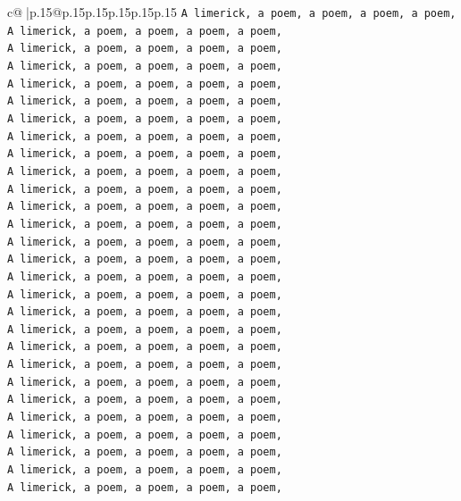 \documentclass{article}
\begin{document}
{\begin{supertabular}{c@{$\;$}|p{.15\linewidth}@{}p{.15\linewidth}p{.15\linewidth}p{.15\linewidth}p{.15\linewidth}p{.15\linewidth}}
{{{\texttt{A limerick, a poem, a poem, a poem, a poem,} \\
\texttt{A limerick, a poem, a poem, a poem, a poem,} \\
\texttt{A limerick, a poem, a poem, a poem, a poem,} \\
\texttt{A limerick, a poem, a poem, a poem, a poem,} \\
\texttt{A limerick, a poem, a poem, a poem, a poem,} \\
\texttt{A limerick, a poem, a poem, a poem, a poem,} \\
\texttt{A limerick, a poem, a poem, a poem, a poem,} \\
\texttt{A limerick, a poem, a poem, a poem, a poem,} \\
\texttt{A limerick, a poem, a poem, a poem, a poem,} \\
\texttt{A limerick, a poem, a poem, a poem, a poem,} \\
\texttt{A limerick, a poem, a poem, a poem, a poem,} \\
\texttt{A limerick, a poem, a poem, a poem, a poem,} \\
\texttt{A limerick, a poem, a poem, a poem, a poem,} \\
\texttt{A limerick, a poem, a poem, a poem, a poem,} \\
\texttt{A limerick, a poem, a poem, a poem, a poem,} \\
\texttt{A limerick, a poem, a poem, a poem, a poem,} \\
\texttt{A limerick, a poem, a poem, a poem, a poem,} \\
\texttt{A limerick, a poem, a poem, a poem, a poem,} \\
\texttt{A limerick, a poem, a poem, a poem, a poem,} \\
\texttt{A limerick, a poem, a poem, a poem, a poem,} \\
\texttt{A limerick, a poem, a poem, a poem, a poem,} \\
\texttt{A limerick, a poem, a poem, a poem, a poem,} \\
\texttt{A limerick, a poem, a poem, a poem, a poem,} \\
\texttt{A limerick, a poem, a poem, a poem, a poem,} \\
\texttt{A limerick, a poem, a poem, a poem, a poem,} \\
\texttt{A limerick, a poem, a poem, a poem, a poem,} \\
\texttt{A limerick, a poem, a poem, a poem, a poem,} \\
\texttt{A limerick, a poem, a poem, a poem, a poem,} \\
}}}
\end{supertabular}}
\end{document}
